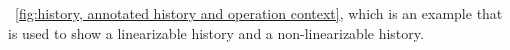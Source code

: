 \figurename~\ref{fig:history, annotated history and
  operation context}, which is an example that is used to show a linearizable history and a non-linearizable history. 
  


